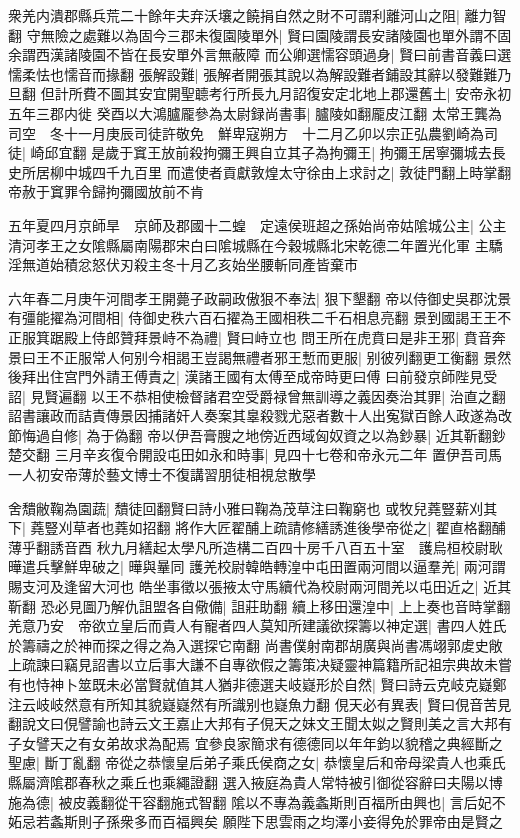 衆羌内潰郡縣兵荒二十餘年夫弃沃壤之饒捐自然之財不可謂利離河山之阻|{
	離力智翻}
守無險之處難以為固今三郡未復園陵單外|{
	賢曰園陵謂長安諸陵園也單外謂不固余謂西漢諸陵園不皆在長安單外言無蔽障}
而公卿選懦容頭過身|{
	賢曰前書音義曰選懦柔怯也懦音而掾翻}
張解設難|{
	張解者開張其說以為解設難者鋪設其辭以發難難乃旦翻}
但計所費不圖其安宜開聖聼考行所長九月詔復安定北地上郡還舊土|{
	安帝永初五年三郡内徙}
癸酉以大鴻臚龎參為太尉録尚書事|{
	臚陵如翻龎皮江翻}
太常王龔為司空　冬十一月庚辰司徒許敬免　鮮卑寇朔方　十二月乙卯以宗正弘農劉崎為司徒|{
	崎邱宜翻}
是歲于窴王放前殺拘彌王興自立其子為拘彌王|{
	拘彌王居寧彌城去長史所居柳中城四千九百里}
而遣使者貢獻敦煌太守徐由上求討之|{
	敦徒門翻上時掌翻}
帝赦于窴罪令歸拘彌國放前不肯

五年夏四月京師旱　京師及郡國十二蝗　定遠侯班超之孫始尚帝姑隂城公主|{
	公主清河孝王之女隂縣屬南陽郡宋白曰隂城縣在今穀城縣北宋乾德二年置光化軍}
主驕淫無道始積忿怒伏刃殺主冬十月乙亥始坐腰斬同產皆棄市

六年春二月庚午河間孝王開薨子政嗣政傲狠不奉法|{
	狠下墾翻}
帝以侍御史吳郡沈景有彊能擢為河間相|{
	侍御史秩六百石擢為王國相秩二千石相息亮翻}
景到國謁王王不正服箕踞殿上侍郎贊拜景峙不為禮|{
	賢曰峙立也}
問王所在虎賁曰是非王邪|{
	賁音奔}
景曰王不正服常人何别今相謁王豈謁無禮者邪王慙而更服|{
	别彼列翻更工衡翻}
景然後拜出住宫門外請王傅責之|{
	漢諸王國有太傅至成帝時更曰傅}
曰前發京師陛見受詔|{
	見賢遍翻}
以王不恭相使檢督諸君空受爵禄曾無訓導之義因奏治其罪|{
	治直之翻}
詔書讓政而詰責傳景因捕諸奸人奏案其辠殺戮尤惡者數十人出寃獄百餘人政遂為改節悔過自修|{
	為于偽翻}
帝以伊吾膏膄之地傍近西域匈奴資之以為鈔暴|{
	近其靳翻鈔楚交翻}
三月辛亥復令開設屯田如永和時事|{
	見四十七卷和帝永元二年}
置伊吾司馬一人初安帝薄於藝文博士不復講習朋徒相視怠散學

舍穨敝鞠為園蔬|{
	穨徒回翻賢曰詩小雅曰鞠為茂草注曰鞠窮也}
或牧兒蕘豎薪刈其下|{
	蕘豎刈草者也蕘如招翻}
將作大匠翟酺上疏請修繕誘進後學帝從之|{
	翟直格翻酺薄乎翻誘音酉}
秋九月繕起太學凡所造構二百四十房千八百五十室　護烏桓校尉耿曄遣兵擊鮮卑破之|{
	曄與曅同}
護羌校尉韓皓轉湟中屯田置兩河間以逼羣羌|{
	兩河謂賜支河及逢留大河也}
皓坐事徵以張掖太守馬續代為校尉兩河間羌以屯田近之|{
	近其靳翻}
恐必見圖乃解仇詛盟各自儆備|{
	詛莊助翻}
續上移田還湟中|{
	上上奏也音時掌翻}
羌意乃安　帝欲立皇后而貴人有寵者四人莫知所建議欲探籌以神定選|{
	書四人姓氏於籌禱之於神而探之得之為入選探它南翻}
尚書僕射南郡胡廣與尚書馮翊郭䖍史敞上疏諫曰竊見詔書以立后事大謙不自專欲假之籌策决疑靈神篇籍所記祖宗典故未嘗有也恃神卜筮既未必當賢就值其人猶非德選夫岐嶷形於自然|{
	賢曰詩云克岐克嶷鄭注云岐岐然意有所知其貌嶷嶷然有所識别也嶷魚力翻}
俔天必有異表|{
	賢曰俔音苦見翻說文曰俔譬諭也詩云文王嘉止大邦有子俔天之妹文王聞太姒之賢則美之言大邦有子女譬天之有女弟故求為配焉}
宜參良家簡求有德德同以年年鈞以貌稽之典經斷之聖慮|{
	斷丁亂翻}
帝從之恭懷皇后弟子乘氏侯商之女|{
	恭懷皇后和帝母梁貴人也乘氏縣屬濟隂郡春秋之乘丘也乘繩證翻}
選入掖庭為貴人常特被引御從容辭曰夫陽以博施為德|{
	被皮義翻從干容翻施式智翻}
隂以不專為義螽斯則百福所由興也|{
	言后妃不妬忌若螽斯則子孫衆多而百福興矣}
願陛下思雲雨之均澤小妾得免於罪帝由是賢之

